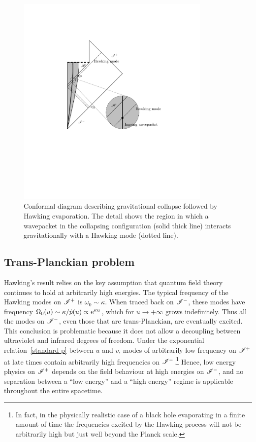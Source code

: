 \documentclass[12pt]{article}
\begin{document}
\begin{figure}[tb]
\begin{center}
\includegraphics[width=9.5cm]{figura.pdf}
\end{center}
\caption{Conformal diagram describing gravitational collapse followed by Hawking evaporation.  The detail shows the region in which a wavepacket in the collapsing configuration (solid thick line) interacts gravitationally with a Hawking mode (dotted line).}
\label{figure1}
\end{figure}
%

\subsection{Trans-Planckian problem}
\label{subsec:tP}

Hawking's result relies on the key assumption that quantum field theory continues to hold at arbitrarily high energies.  The typical frequency of the Hawking modes on $\mathscr{I}^+$ is $\omega_0\sim\kappa$.  When traced back on $\mathscr{I}^-$, these modes have frequency $\Omega_0(u)\sim\kappa/\dot{p}(u) \propto {\mathrm e}^{\kappa u}$, which for $u\rightarrow +\infty$ grows indefinitely.  Thus all the modes on $\mathscr{I}^-$, even those that are trans-Planckian, are eventually excited.  This conclusion is problematic because it does not allow a decoupling between ultraviolet and infrared degrees of freedom.  Under the exponential relation~\eqref{standard-p} between $u$ and $v$, modes of arbitrarily low frequency on $\mathscr{I}^+$ at late times contain arbitrarily high frequencies on $\mathscr{I}^-$.\footnote{ In fact, in the physically realistic case of a black hole evaporating in a finite amount of time the frequencies excited by the Hawking process will not be arbitrarily high but  just well beyond the Planck scale.}  Hence, low energy physics on $\mathscr{I}^+$ depends on the field behaviour at high energies on $\mathscr{I}^-$, and no separation between a ``low energy'' and a ``high energy'' regime is applicable throughout the entire  spacetime.  
\end{document}
